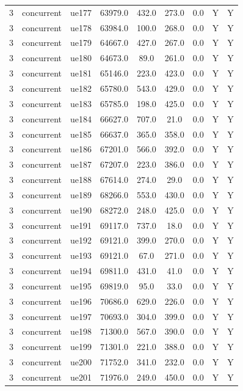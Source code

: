 \begin{table}[ht]
\begin{tabular}{|c|c|c|c|c|c|c|c|c|}
3 & concurrent & ue177 & 63979.0 & 432.0 & 273.0 & 0.0 & Y & Y \\
3 & concurrent & ue178 & 63984.0 & 100.0 & 268.0 & 0.0 & Y & Y \\
3 & concurrent & ue179 & 64667.0 & 427.0 & 267.0 & 0.0 & Y & Y \\
3 & concurrent & ue180 & 64673.0 & 89.0 & 261.0 & 0.0 & Y & Y \\
3 & concurrent & ue181 & 65146.0 & 223.0 & 423.0 & 0.0 & Y & Y \\
3 & concurrent & ue182 & 65780.0 & 543.0 & 429.0 & 0.0 & Y & Y \\
3 & concurrent & ue183 & 65785.0 & 198.0 & 425.0 & 0.0 & Y & Y \\
3 & concurrent & ue184 & 66627.0 & 707.0 & 21.0 & 0.0 & Y & Y \\
3 & concurrent & ue185 & 66637.0 & 365.0 & 358.0 & 0.0 & Y & Y \\
3 & concurrent & ue186 & 67201.0 & 566.0 & 392.0 & 0.0 & Y & Y \\
3 & concurrent & ue187 & 67207.0 & 223.0 & 386.0 & 0.0 & Y & Y \\
3 & concurrent & ue188 & 67614.0 & 274.0 & 29.0 & 0.0 & Y & Y \\
3 & concurrent & ue189 & 68266.0 & 553.0 & 430.0 & 0.0 & Y & Y \\
3 & concurrent & ue190 & 68272.0 & 248.0 & 425.0 & 0.0 & Y & Y \\
3 & concurrent & ue191 & 69117.0 & 737.0 & 18.0 & 0.0 & Y & Y \\
3 & concurrent & ue192 & 69121.0 & 399.0 & 270.0 & 0.0 & Y & Y \\
3 & concurrent & ue193 & 69121.0 & 67.0 & 271.0 & 0.0 & Y & Y \\
3 & concurrent & ue194 & 69811.0 & 431.0 & 41.0 & 0.0 & Y & Y \\
3 & concurrent & ue195 & 69819.0 & 95.0 & 33.0 & 0.0 & Y & Y \\
3 & concurrent & ue196 & 70686.0 & 629.0 & 226.0 & 0.0 & Y & Y \\
3 & concurrent & ue197 & 70693.0 & 304.0 & 399.0 & 0.0 & Y & Y \\
3 & concurrent & ue198 & 71300.0 & 567.0 & 390.0 & 0.0 & Y & Y \\
3 & concurrent & ue199 & 71301.0 & 221.0 & 388.0 & 0.0 & Y & Y \\
3 & concurrent & ue200 & 71752.0 & 341.0 & 232.0 & 0.0 & Y & Y \\
3 & concurrent & ue201 & 71976.0 & 249.0 & 450.0 & 0.0 & Y & Y \\

\end{tabular}
\end{table}
